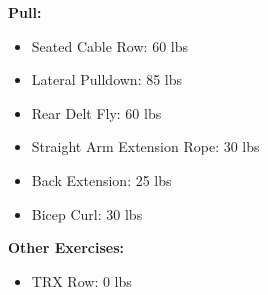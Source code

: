 \documentclass{article}
\begin{document}
\def\scr{60 }
\def\lp{85 }
\def\rdf{60 }
\def\saer{30 }
\def\be{25 }
\def\bc{30 }
\def\lr{10 }

\def\trxr{0 }

\textbf{Pull:}
\begin{itemize}
	\item Seated Cable Row: \hfill\scr lbs
	\item Lateral Pulldown: \hfill\lp lbs
	\item Rear Delt Fly: \hfill\rdf lbs
	\item Straight Arm Extension Rope: \hfill\saer lbs
	\item Back Extension: \hfill\be lbs
	\item Bicep Curl: \hfill\bc lbs
\end{itemize}\leavevmode\newline

\textbf{Other Exercises:}
\begin{itemize}
	\item TRX Row: \hfill\trxr lbs
\end{itemize}
\end{document}
